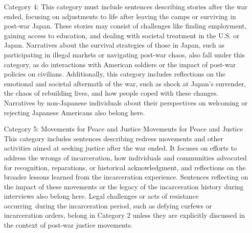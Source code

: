 Category 4: This category must include sentences describing stories after the war ended, focusing on adjustments to life after leaving the camps or surviving in post-war Japan. These stories may consist of challenges like finding employment, gaining access to education, and dealing with societal treatment in the U.S. or Japan. Narratives about the survival strategies of those in Japan, such as participating in illegal markets or navigating post-war chaos, also fall under this category, as do interactions with American soldiers or the impact of post-war policies on civilians.
Additionally, this category includes reflections on the emotional and societal aftermath of the war, such as shock at Japan's surrender, the chaos of rebuilding lives, and how people coped with these changes. Narratives by non-Japanese individuals about their perspectives on welcoming or rejecting Japanese Americans also belong here. 

Category 5: Movements for Peace and Justice
Movements for Peace and Justice
This category includes sentences describing redress movements and other activities aimed at seeking justice after the war ended. It focuses on efforts to address the wrongs of incarceration, how individuals and communities advocated for recognition, reparations, or historical acknowledgment, and reflections on the broader lessons learned from the incarceration experience. Sentences reflecting on the impact of these movements or the legacy of the incarceration history during interviews also belong here.
Legal challenges or acts of resistance occurring during the incarceration period, such as defying curfews or incarceration orders, belong in Category 2 unless they are explicitly discussed in the context of post-war justice movements.



